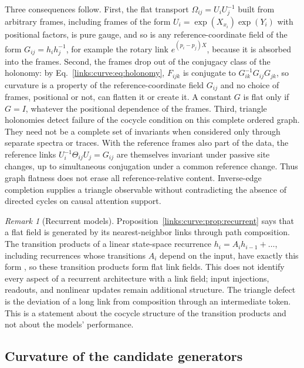 \documentclass[11pt]{article}
\theoremstyle{definition}
\theoremstyle{remark}
\newtheorem{remark}[theorem]{Remark}
\begin{document}
Three consequences follow. First, the flat transport $\Omega_{ij}=U_iU_j^{-1}$ built from arbitrary frames, including frames of the form $U_i=\exp(X_{x_i})\exp(Y_i)$ with positional factors, is pure gauge, and so is any reference-coordinate field of the form $G_{ij}=h_ih_j^{-1}$, for example the rotary link $e^{(p_i-p_j)X}$, because it is absorbed into the frames. Second, the frames drop out of the conjugacy class of the holonomy: by Eq.~\eqref{links:curve:eq:holonomy}, $F_{ijk}$ is conjugate to $G_{ik}^{-1}G_{ij}G_{jk}$, so curvature is a property of the reference-coordinate field $G_{ij}$ and no choice of frames, positional or not, can flatten it or create it. A constant $G$ is flat only if $G=I$, whatever the positional dependence of the frames. Third, triangle holonomies detect failure of the cocycle condition on this complete ordered graph. They need not be a complete set of invariants when considered only through separate spectra or traces. With the reference frames also part of the data, the reference links $U_i^{-1}\Theta_{ij}U_j=G_{ij}$ are themselves invariant under passive site changes, up to simultaneous conjugation under a common reference change. Thus graph flatness does not erase all reference-relative content. Inverse-edge completion supplies a triangle observable without contradicting the absence of directed cycles on causal attention support.

\begin{remark}[Recurrent models]
Proposition~\ref{links:curve:prop:recurrent} says that a flat field is generated by its nearest-neighbor links through path composition. The transition products of a linear state-space recurrence $h_i=A_ih_{i-1}+\dots$, including recurrences whose transitions $A_i$ depend on the input, have exactly this form \cite{links:gu2022s4,links:gu2023mamba}, so these transition products form flat link fields. This does not identify every aspect of a recurrent architecture with a link field; input injections, readouts, and nonlinear updates remain additional structure. The triangle defect is the deviation of a long link from composition through an intermediate token. This is a statement about the cocycle structure of the transition products and not about the models' performance.
\end{remark}

\subsection{Curvature of the candidate generators}
\label{links:curve:sec:candidates}
\end{document}
